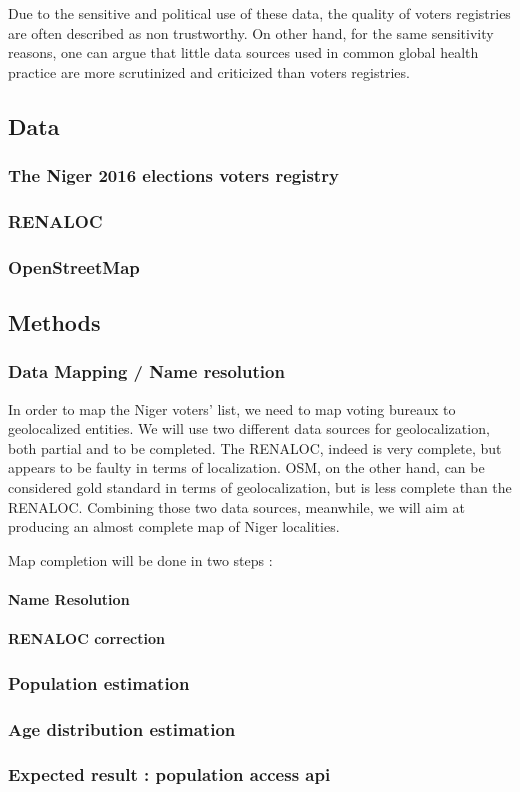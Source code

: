 Due to the sensitive and political use of these data, the quality of voters registries are often described as non trustworthy. On other hand, for the same sensitivity reasons, one can argue that little data sources used in common global health practice are more scrutinized and criticized than voters registries.

\subsection{Data}

\subsubsection{The Niger 2016 elections voters registry}

\subsubsection{RENALOC}

\subsubsection{OpenStreetMap}

\subsection{Methods}

\subsubsection{Data Mapping / Name resolution}

In order to map the Niger voters' list, we need to map voting bureaux to geolocalized entities. We will use two different data sources for geolocalization, both partial and to be completed. The RENALOC, indeed is very complete, but appears to be faulty in terms of localization. OSM, on the other hand, can be considered gold standard in terms of geolocalization, but is less complete than the RENALOC. Combining those two data sources, meanwhile, we will aim at producing an almost complete map of Niger localities.

Map completion will be done in two steps :


\paragraph{Name Resolution}

\paragraph{RENALOC correction}



\subsubsection{Population estimation}

\subsubsection{Age distribution estimation}

\subsubsection{Expected result : population access api}
